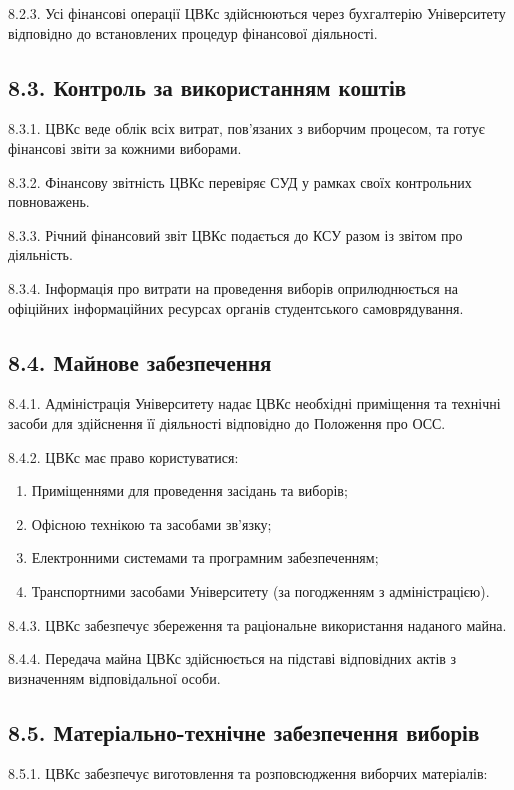     8.2.3. Усі фінансові операції ЦВКс здійснюються через бухгалтерію Університету відповідно до встановлених процедур фінансової діяльності.

\subsection*{8.3. Контроль за використанням коштів}
    8.3.1. ЦВКс веде облік всіх витрат, пов'язаних з виборчим процесом, та готує фінансові звіти за кожними виборами.

    8.3.2. Фінансову звітність ЦВКс перевіряє СУД у рамках своїх контрольних повноважень.

    8.3.3. Річний фінансовий звіт ЦВКс подається до КСУ разом із звітом про діяльність.

    8.3.4. Інформація про витрати на проведення виборів оприлюднюється на офіційних інформаційних ресурсах органів студентського самоврядування.

\subsection*{8.4. Майнове забезпечення}
    8.4.1. Адміністрація Університету надає ЦВКс необхідні приміщення та технічні засоби для здійснення її діяльності відповідно до Положення про ОСС.

    8.4.2. ЦВКс має право користуватися:

        \begin{enumerate}[label=\alph*)]
            \item Приміщеннями для проведення засідань та виборів;
            \item Офісною технікою та засобами зв'язку;
            \item Електронними системами та програмним забезпеченням;
            \item Транспортними засобами Університету (за погодженням з адміністрацією).
        \end{enumerate}

    8.4.3. ЦВКс забезпечує збереження та раціональне використання наданого майна.

    8.4.4. Передача майна ЦВКс здійснюється на підставі відповідних актів з визначенням відповідальної особи.

\subsection*{8.5. Матеріально-технічне забезпечення виборів}
    8.5.1. ЦВКс забезпечує виготовлення та розповсюдження виборчих матеріалів:


